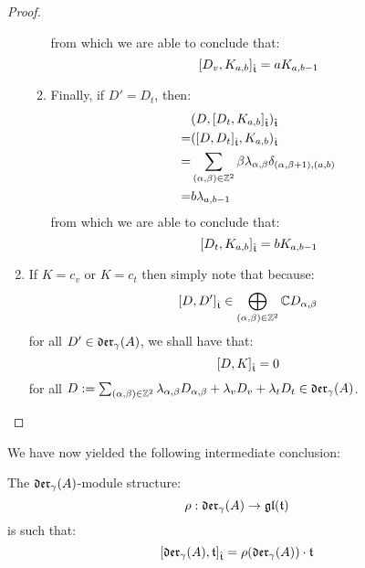\begin{proof}
\begin{enumerate}
\begin{enumerate}
$$                            $$
                        from which we are able to conclude that:
                            $$[D_v, K_{a, b}]_{\hat{\mathfrak{t}}} = aK_{a, b - 1}$$   
                        \item Finally, if $D' = D_t$, then:
                            $$
                                \begin{aligned}
                                    & ( D, [D_t, K_{a, b}]_{\hat{\mathfrak{t}}} )_{\hat{\mathfrak{t}}}
                                    \\
                                    = & ( [D, D_t]_{\hat{\mathfrak{t}}}, K_{a, b} )_{\hat{\mathfrak{t}}}
                                    \\
                                    = & \sum_{(\alpha, \beta) \in \mathbb{Z}^2} \beta \lambda_{\alpha, \beta} \delta_{(\alpha, \beta + 1), (a, b)} 
                                    \\
                                    = & b \lambda_{a, b - 1}
                                \end{aligned}
                            $$
                        from which we are able to conclude that:
                            $$[D_t, K_{a, b}]_{\hat{\mathfrak{t}}} = b K_{a, b - 1}$$
                    \end{enumerate}
                    \item If $K = c_v$ or $K = c_t$ then simply note that because:
                        $$[D, D']_{\hat{\mathfrak{t}}} \in \bigoplus_{(\alpha, \beta) \in \mathbb{Z}^2} \mathbb{C} D_{\alpha, \beta}$$
                    for all $D' \in \mathfrak{der}_{\gamma}(A)$, we shall have that:
                        $$[D, K]_{\hat{\mathfrak{t}}} = 0$$
                    for all $D := \sum_{(\alpha, \beta) \in \mathbb{Z}^2} \lambda_{\alpha, \beta} D_{\alpha, \beta} + \lambda_v D_v + \lambda_t D_t \in \mathfrak{der}_{\gamma}(A)$.
                \end{enumerate}
            \end{proof}
        We have now yielded the following intermediate conclusion:
        \begin{proposition} \label{prop: toroidal_lie_algebras_as_modules_over_div_0_vector_field_lie_algebras}
            The $\mathfrak{der}_{\gamma}(A)$-module structure:
                $$\rho: \mathfrak{der}_{\gamma}(A) \to \mathfrak{gl}(\mathfrak{t})$$
            is such that:
                $$[\mathfrak{der}_{\gamma}(A), \mathfrak{t}]_{\hat{\mathfrak{t}}} = \rho(\mathfrak{der}_{\gamma}(A)) \cdot \mathfrak{t}$$
        \end{proposition}

